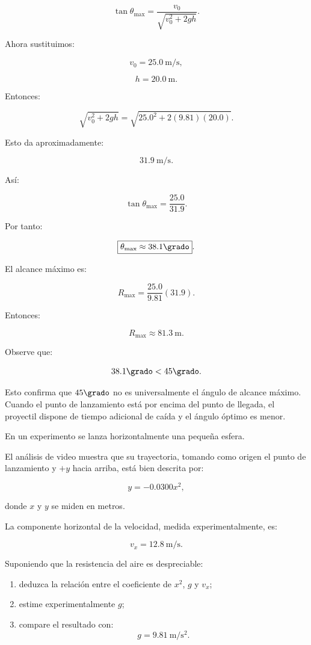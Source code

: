 \begin{explicacion}
\[
\boxed{
\tan\theta_{\max}
=
\frac{
v_0
}{
\sqrt{
v_0^2+2gh
}
}
}.
\]

Ahora sustituimos:

\[
v_0=\SI{25.0}{\meter\per\second},
\]

\[
h=\SI{20.0}{\meter}.
\]

Entonces:

\[
\sqrt{
v_0^2+2gh
}
=
\sqrt{
25.0^2+2(9.81)(20.0)
}.
\]

Esto da aproximadamente:

\[
\SI{31.9}{\meter\per\second}.
\]

Así:

\[
\tan\theta_{\max}
=
\frac{25.0}{31.9}.
\]

Por tanto:

\[
\boxed{
\theta_{\max}\approx38.1\grado
}.
\]

El alcance máximo es:

\[
R_{\max}
=
\frac{25.0}{9.81}(31.9).
\]

Entonces:

\[
\boxed{
R_{\max}\approx\SI{81.3}{\meter}
}.
\]

Observe que:

\[
38.1\grado<45\grado.
\]

Esto confirma que \(45\grado\) no es universalmente el ángulo de alcance máximo.
Cuando el punto de lanzamiento está por encima del punto de llegada, el
proyectil dispone de tiempo adicional de caída y el ángulo óptimo es menor.
\end{explicacion}


\begin{ejercicio}
En un experimento se lanza horizontalmente una pequeña esfera.

El análisis de video muestra que su trayectoria, tomando como origen el punto de
lanzamiento y \(+y\) hacia arriba, está bien descrita por:

\[
y=-0.0300x^2,
\]

donde \(x\) y \(y\) se miden en metros.

La componente horizontal de la velocidad, medida experimentalmente, es:

\[
v_x=\SI{12.8}{\meter\per\second}.
\]

Suponiendo que la resistencia del aire es despreciable:

\begin{enumerate}[label=\alph*)]
    \item deduzca la relación entre el coeficiente de \(x^2\), \(g\) y \(v_x\);
    \item estime experimentalmente \(g\);
    \item compare el resultado con:
    \[
    g=\SI{9.81}{\meter\per\second\squared}.
    \]
\end{enumerate}
\end{ejercicio}

